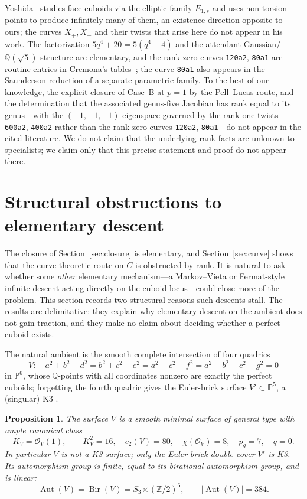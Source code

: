 \documentclass[11pt,reqno]{amsart}
\theoremstyle{plain}
\newtheorem{proposition}[theorem]{Proposition}
\theoremstyle{definition}
\newcommand{\Q}{\mathbb{Q}}
\newcommand{\Z}{\mathbb{Z}}
\newcommand{\PP}{\mathbb{P}}
\newcommand{\Aut}{\operatorname{Aut}}
\newcommand{\Bir}{\operatorname{Bir}}
\begin{document}
Yoshida~\cite{yoshida} studies face cuboids via the elliptic family $E_{1,s}$
and uses non-torsion points to produce infinitely many of them, an existence
direction opposite to ours; the curves $X_+,X_-$ and their twists that arise
here do not appear in his work. The factorization $5q^4+20=5(q^4+4)$ and the
attendant Gaussian/$\Q(\sqrt5)$ structure are elementary, and the rank-zero
curves \texttt{120a2}, \texttt{80a1} are routine entries in Cremona's
tables~\cite{cremona}; the curve \texttt{80a1} also appears in the Saunderson
reduction of a separate parametric family. To the best of our knowledge, the
explicit closure of Case~B at $p=1$ by the Pell--Lucas route, and the
determination that the associated genus-five Jacobian has rank equal to its
genus---with the $(-1,-1,-1)$-eigenspace governed by the rank-one twists
\texttt{600a2}, \texttt{400a2} rather than the rank-zero curves
\texttt{120a2}, \texttt{80a1}---do not appear in the cited literature. We do
not claim that the underlying rank facts are unknown to specialists; we claim
only that this precise statement and proof do not appear there.

\section{Structural obstructions to elementary descent}\label{sec:obstructions}

The closure of Section~\ref{sec:closure} is elementary, and
Section~\ref{sec:curve} shows that the curve-theoretic route on $C$ is obstructed
by rank. It is natural to ask whether some \emph{other} elementary mechanism---a
Markov--Vieta or Fermat-style infinite descent acting directly on the cuboid
locus---could close more of the problem. This section records two structural
reasons such descents stall. The results are delimitative: they explain why
elementary descent on the ambient does not gain traction, and they make no claim
about deciding whether a perfect cuboid exists.

The natural ambient is the smooth complete intersection of four quadrics
\[
V:\quad a^2+b^2-d^2=b^2+c^2-e^2=a^2+c^2-f^2=a^2+b^2+c^2-g^2=0
\]
in $\PP^6$, whose $\Q$-points with all coordinates nonzero are exactly the perfect
cuboids; forgetting the fourth quadric gives the Euler-brick surface
$V'\subset\PP^5$, a (singular) K3 \cite{vanLuijk}.

\begin{proposition}\label{prop:geomV}
The surface $V$ is a smooth minimal surface of general type with ample canonical
class
\[
K_V=\mathcal{O}_V(1),\qquad K_V^2=16,\quad c_2(V)=80,\quad
\chi(\mathcal{O}_V)=8,\quad p_g=7,\quad q=0 .
\]
In particular $V$ is \emph{not} a K3 surface; only the Euler-brick double cover
$V'$ is K3. Its automorphism group is finite, equal to its birational
automorphism group, and is linear:
\[
\Aut(V)=\Bir(V)=S_3\ltimes(\Z/2)^6,\qquad|\Aut(V)|=384 .
\]
\end{proposition}
\end{document}
